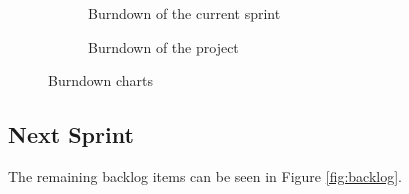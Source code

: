 \begin{figure}[!ht]
    \centering
    \begin{subfigure}[b]{0.5\textwidth}
        \scalebox{.6}{}
        \caption{Burndown of the current sprint}
        \label{fig:burndownSprint}
    \end{subfigure}%
    \begin{subfigure}[b]{0.5\textwidth}
        \scalebox{.7}{}
        \caption{Burndown of the project}
        \label{fig:burndownProject}
    \end{subfigure}
    \caption{Burndown charts}
\end{figure}

\subsection{Next Sprint}
The remaining backlog items can be seen in Figure \ref{fig:backlog}.
\begin{itemize}
\end{itemize}

